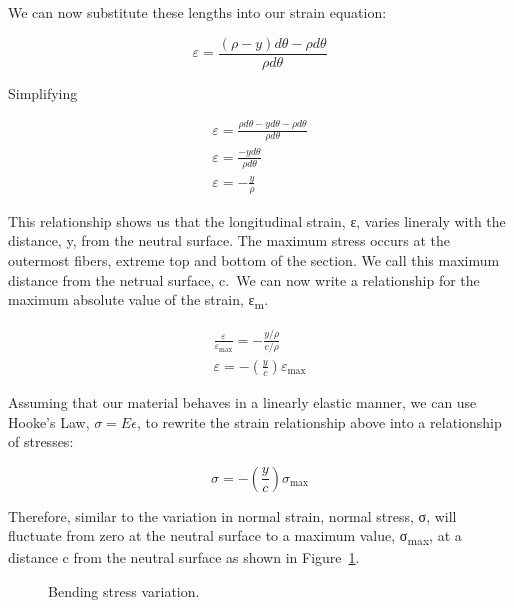 \documentclass[
  letterpaper,
  DIV=11,
  numbers=noendperiod]{scrreprt}
\theoremstyle{definition}
\theoremstyle{remark}
\begin{document}
We can now substitute these lengths into our strain equation:

\[
\varepsilon=\frac{(\rho-y) d \theta-\rho d \theta}{\rho d \theta}
\]

Simplifying

\[
\begin{gathered}
\varepsilon=\frac{\rho d \theta-y d \theta-\rho d \theta}{\rho d \theta} \\
\varepsilon=\frac{-y d \theta}{\rho d \theta} \\
\varepsilon=-\frac{y}{\rho}
\end{gathered}
\]

This relationship shows us that the longitudinal strain, ε, varies
lineraly with the distance, y, from the neutral surface. The maximum
stress occurs at the outermost fibers, extreme top and bottom of the
section. We call this maximum distance from the netrual surface, c.~We
can now write a relationship for the maximum absolute value of the
strain, ε\textsubscript{m}.

\[
\begin{gathered}
\frac{\varepsilon}{\varepsilon_{\max }}=-\frac{y / \rho}{c / \rho} \\
\varepsilon=-\left(\frac{y}{c}\right) \varepsilon_{\max }
\end{gathered}
\]

Assuming that our material behaves in a linearly elastic manner, we can
use Hooke's Law, \(\sigma = E \epsilon\), to rewrite the strain
relationship above into a relationship of stresses:

\[
\sigma=-\left(\frac{y}{c}\right) \sigma_{\max }
\]

Therefore, similar to the variation in normal strain, normal stress, σ,
will fluctuate from zero at the neutral surface to a maximum value,
σ\textsubscript{max}, at a distance c from the neutral surface as shown
in Figure~\ref{fig-9.7}.

\begin{figure}


\caption{\label{fig-9.7}Bending stress variation.}

\end{figure}%
\end{document}
